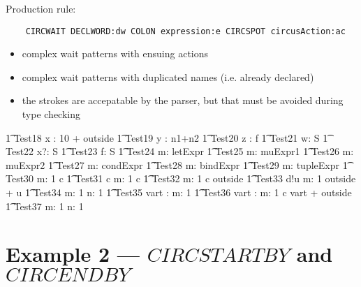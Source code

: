 \documentclass{article}
\begin{document}
Production rule:
\begin{verbatim}
	CIRCWAIT DECLWORD:dw COLON expression:e CIRCSPOT circusAction:ac
\end{verbatim}
%
\begin{itemize}
	\item complex wait patterns with ensuing actions
	\item complex wait patterns with duplicated names (i.e. already declared)
        \item the strokes are accepatable by the parser, but that must be avoided during type checking
\end{itemize}

%
\begin{circusaction}
   \t1 Test18 \circdef \circwait x : 10 + outside \circspot \Skip
   \also
   \t1 Test19 \circdef \circwait y : n1+n2 \circspot \Skip 
   \also
   \t1 Test20 \circdef \circwait z : f \circspot \Skip
   \also
   \t1 Test21 \circdef \circwait w: \theta S \circspot \Skip
   \also
   \t1 Test22 \circdef \circwait x?: S \circspot \Skip
   \also
   \t1 Test23 \circdef \circwait f: S \circspot \Skip
   \also
   \t1 Test24 \circdef \circwait m: letExpr \circspot \Skip
   \also
   \t1 Test25 \circdef \circwait m: muExpr1 \circspot \Skip
   \also
   \t1 Test26 \circdef \circwait m: muExpr2 \circspot \Skip
   \also
   \t1 Test27 \circdef \circwait m: condExpr \circspot \Skip
   \also
   \t1 Test28 \circdef \circwait m: bindExpr \circspot \Skip
   \also
   \t1 Test29 \circdef \circwait m: tupleExpr \circspot \Skip
   \also
   \t1 Test30 \circdef \circwait m: 1  \circspot c \then \Skip
   \also
   \t1 Test31 \circdef c \then \circwait m: 1  \circspot c \then \Skip
   \also
   \t1 Test32 \circdef \circwait m: 1  \circspot c \then \circwait outside 
   \also
   \t1 Test33 \circdef d!u \then \circwait m: 1  \circspot \circwait outside + u 
   \also
   \t1 Test34 \circdef \circwait m: 1  \circspot \Skip \circseq \circwait n: 1  
   \circspot \Skip
   \also
   \t1 Test35 \circdef \circvres vart : \nat \circspot \circwait m: 1  \circspot \Skip 
   \also
   \t1 Test36 \circdef \circvres vart : \nat \circspot \circwait m: 1  \circspot c \then 
   \circwait vart + outside
   \also
   \t1 Test37 \circdef \circwait m: 1  \circspot \circwait n: 1  \circspot \Skip
\end{circusaction}

        
\section{Example 2 --- $CIRCSTARTBY$ and $CIRCENDBY$}
\end{document}
